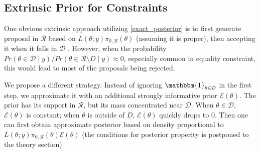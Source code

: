 \documentclass[10pt]{article}
\newcommand{\mc}[1]{\mathcal{#1}}
\begin{document}



\subsection{Extrinsic Prior for Constraints}

One obvious extrinsic approach utilizing \eqref{exact_posterior} is to first generate proposal in $\mc R$ based on $L(\theta;y)\pi_{0,\mc R}(\theta)$ (assuming it is proper), then accepting it when it falls in $\mc D$ \citep{gelfand1992bayesian}. However, when the probability $Pr(\theta\in \mc D \mid y) / Pr(\theta\in \mc R \setminus D \mid y) \approx 0$, especially common in equality constraint, this would lead to most of the proposals being rejected.

We propose a different strategy. Instead of ignoring $\mathbbm{1}_{\theta\in \mc D} $ in the first step, we approximate it with an additional strongly informative prior $\mc E(\theta)$. The prior has its support in $\mc R$, but its mass concentrated near $\mc D$. When $\theta \in \mc D$, $\mc E(\theta)$ is constant; when $\theta$ is outside of $D$, $\mc E(\theta)$ quickly drops to $0$. Then one can first obtain approximate posterior based on density proportional to $L(\theta;y)\pi_{0,\mc R}(\theta)\mc E(\theta)$ (the conditions for posterior properity is postponed to the theory section).
\end{document}
